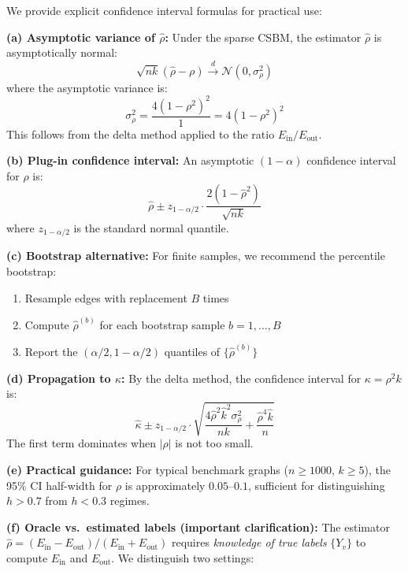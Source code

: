 \begin{remark}
\label{rem:rho_confidence_interval}
We provide explicit confidence interval formulas for practical use:

\textbf{(a) Asymptotic variance of $\hat{\rho}$:}
Under the sparse CSBM, the estimator $\hat{\rho}$ is asymptotically normal:
\begin{equation}
    \sqrt{nk}(\hat{\rho} - \rho) \xrightarrow{d} \mathcal{N}(0, \sigma_\rho^2)
\end{equation}
where the asymptotic variance is:
\begin{equation}
    \sigma_\rho^2 = \frac{4(1 - \rho^2)^2}{1} = 4(1 - \rho^2)^2
\end{equation}
This follows from the delta method applied to the ratio $E_{\mathrm{in}}/E_{\mathrm{out}}$.

\textbf{(b) Plug-in confidence interval:}
An asymptotic $(1-\alpha)$ confidence interval for $\rho$ is:
\begin{equation}
    \hat{\rho} \pm z_{1-\alpha/2} \cdot \frac{2(1 - \hat{\rho}^2)}{\sqrt{nk}}
\end{equation}
where $z_{1-\alpha/2}$ is the standard normal quantile.

\textbf{(c) Bootstrap alternative:}
For finite samples, we recommend the percentile bootstrap:
\begin{enumerate}
    \item Resample edges with replacement $B$ times
    \item Compute $\hat{\rho}^{(b)}$ for each bootstrap sample $b = 1, \ldots, B$
    \item Report the $(\alpha/2, 1-\alpha/2)$ quantiles of $\{\hat{\rho}^{(b)}\}$
\end{enumerate}

\textbf{(d) Propagation to $\kappa$:}
By the delta method, the confidence interval for $\kappa = \rho^2 k$ is:
\begin{equation}
    \hat{\kappa} \pm z_{1-\alpha/2} \cdot \sqrt{\frac{4\hat{\rho}^2 \hat{k}^2 \sigma_\rho^2}{nk} + \frac{\hat{\rho}^4 \hat{k}}{n}}
\end{equation}
The first term dominates when $|\rho|$ is not too small.

\textbf{(e) Practical guidance:}
For typical benchmark graphs ($n \geq 1000$, $k \geq 5$), the 95\% CI half-width for $\rho$ is approximately $0.05$--$0.1$, sufficient for distinguishing $h > 0.7$ from $h < 0.3$ regimes.

\textbf{(f) Oracle vs.\ estimated labels (important clarification):}
The estimator $\hat{\rho} = (E_{\mathrm{in}} - E_{\mathrm{out}})/(E_{\mathrm{in}} + E_{\mathrm{out}})$ requires \textit{knowledge of true labels} $\{Y_v\}$ to compute $E_{\mathrm{in}}$ and $E_{\mathrm{out}}$. We distinguish two settings:


\end{remark}
